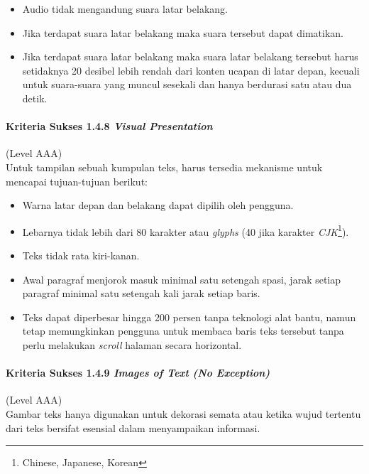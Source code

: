 \begin{itemize}
	\item Audio tidak mengandung suara latar belakang.
	\item Jika terdapat suara latar belakang maka suara tersebut dapat dimatikan.
	\item Jika terdapat suara latar belakang maka suara latar belakang tersebut harus setidaknya 20 desibel lebih rendah dari konten ucapan di latar depan, kecuali untuk suara-suara yang muncul sesekali dan hanya berdurasi satu atau dua detik.
\end{itemize}

\paragraph{Kriteria Sukses 1.4.8 \textit{Visual Presentation}}
\label{sec:kriteria_sukses_1.4.8}
(Level AAA)\\

Untuk tampilan sebuah kumpulan teks, harus tersedia mekanisme untuk mencapai tujuan-tujuan berikut:

\begin{itemize}
	\item Warna latar depan dan belakang dapat dipilih oleh pengguna.
	\item Lebarnya tidak lebih dari 80 karakter atau \textit{glyphs} (40 jika karakter \textit{CJK}\footnote{Chinese, Japanese, Korean}).
	\item Teks tidak rata kiri-kanan.
	\item Awal paragraf menjorok masuk minimal satu setengah spasi, jarak setiap paragraf minimal satu setengah kali jarak setiap baris.
	\item Teks dapat diperbesar hingga 200 persen tanpa teknologi alat bantu, namun tetap memungkinkan pengguna untuk membaca baris teks tersebut tanpa perlu melakukan \textit{scroll} halaman secara horizontal.
\end{itemize}

\paragraph{Kriteria Sukses 1.4.9 \textit{Images of Text (No Exception)}}
\label{sec:kriteria_sukses_1.4.9}
(Level AAA)\\

Gambar teks hanya digunakan untuk dekorasi semata atau ketika wujud tertentu dari teks bersifat esensial dalam menyampaikan informasi.


